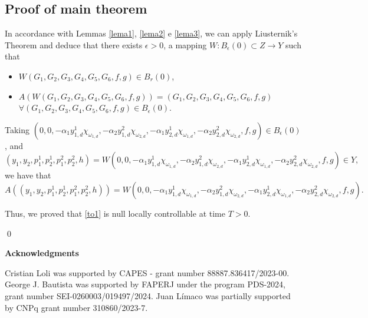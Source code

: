 \documentclass[11pt,a4paper]{amsart}
\numberwithin{equation}{section}
\begin{document}
\subsection{Proof of main theorem}

In accordance with Lemmas \eqref{lema1}, \eqref{lema2} e \eqref{lema3}, we can apply Liusternik’s Theorem and deduce that there exists $\epsilon > 0$, a mapping $W : B_\epsilon(0) \subset Z \rightarrow Y$ such that 

\begin{itemize}
    \item $W (G_1, G_2, G_3, G_4, G_5, G_6,f,g) \in B_r(0)$, 
    \item $A(W (G_1, G_2, G_3, G_4, G_5, G_6,f,g)) = (G_1, G_2,     G_3, G_4, G_5, G_6,f,g)$ \\
        $\forall (G_1, G_2, G_3, G_4, G_5, G_6,f,g) \in B_\epsilon(0)$.
\end{itemize}



\noindent Taking $(0, 0, -\alpha_1y^1_{1,d}\chi_{\omega_{1,d}},-\alpha_2y^2_{1,d}\chi_{\omega_{2,d}},-\alpha_1y^1_{2,d}\chi_{\omega_{1,d}},-\alpha_2y^2_{2,d}\chi_{\omega_{2,d}}, f,g) \in B_\epsilon(0)$, and
$$
    (y_1,y_2,p^1_1,p^1_2,p^2_1,p^2_2,h) = W (0, 0, -\alpha_1y^1_{1,d}\chi_{\omega_{1,d}},-\alpha_2y^2_{1,d}\chi_{\omega_{2,d}},-\alpha_1y^1_{2,d}\chi_{\omega_{1,d}},-\alpha_2y^2_{2,d}\chi_{\omega_{2,d}}, f,g) \in Y,
$$
we have that 
$$
    A((y_1,y_2,p^1_1,p^1_2,p^2_1,p^2_2,h)) = W (0, 0, -\alpha_1y^1_{1,d}\chi_{\omega_{1,d}},-\alpha_2y^2_{1,d}\chi_{\omega_{2,d}},-\alpha_1y^1_{2,d}\chi_{\omega_{1,d}},-\alpha_2y^2_{2,d}\chi_{\omega_{2,d}}, f,g).
$$

Thus, we proved that \eqref{to1} is null locally controllable at time $T > 0$.

\hfill\qed

\noindent\textbf{Acknowledgments}

\noindent Cristian Loli was  supported by  CAPES - grant number 88887.836417/2023-00.  George J. Bautista was  supported by FAPERJ under the program PDS-2024, grant number SEI-0260003/019497/2024. Juan Límaco was partially supported by CNPq grant number 310860/2023-7.  



	
\end{document}
